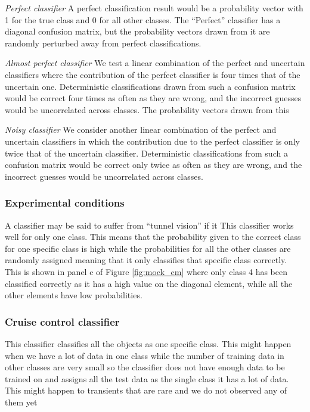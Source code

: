 \textit{Perfect classifier}
A perfect classification result would be a probability vector with 1 for the true class and 0 for all other classes.
The ``Perfect'' classifier has a diagonal confusion matrix, but the probability vectors drawn from it are randomly perturbed away from perfect classifications.

\textit{Almost perfect classifier}
We test a linear combination of the perfect and uncertain classifiers where the contribution of the perfect classifier is four times that of the uncertain one.
Deterministic classifications drawn from such a confusion matrix would be correct four times as often as they are wrong, and the incorrect guesses would be uncorrelated across classes.
The probability vectors drawn from this

\textit{Noisy classifier}
We consider another linear combination of the perfect and uncertain classifiers in which the contribution due to the perfect classifier is only twice that of the uncertain classifier.
Deterministic classifications from such a confusion matrix would be correct only twice as often as they are wrong, and the incorrect guesses would be uncorrelated across classes.

\subsubsection{Experimental conditions}
\label{sec:biased}

A classifier may be said to suffer from ``tunnel vision'' if it This classifier works well for only one class.
This means that the probability given to the correct class for one specific class is high while the probabilities for all the other classes are randomly assigned meaning that it only classifies that specific class correctly.
This is shown in panel c of Figure \ref{fig:mock_cm} where only class 4 has been classified correctly as it has a high value on the diagonal element, while all the other elements have low probabilities.

\subsubsection{Cruise control classifier}
\label{sec:cruise_data}

This classifier classifies all the objects as one specific class.
This might happen when we have a lot of data in one class while the number of training data in other classes are very small so the classifier does not have enough data to be trained on and assigns all the test data as the single class it has a lot of data.
This might happen to transients that are rare and we do not observed any of them yet 

